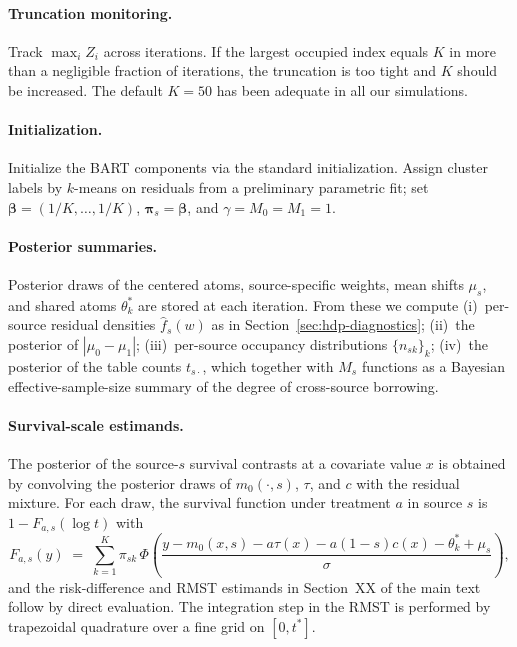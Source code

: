 \documentclass[11pt]{article}
\begin{document}
\paragraph{Truncation monitoring.} Track $\max_i Z_i$ across iterations. If the largest occupied index equals $K$ in more than a negligible fraction of iterations, the truncation is too tight and $K$ should be increased. The default $K = 50$ has been adequate in all our simulations.

\paragraph{Initialization.} Initialize the BART components via the standard \citet{chipman2010bart} initialization. Assign cluster labels by $k$-means on residuals from a preliminary parametric fit; set $\bm{\beta} = (1/K, \ldots, 1/K)$, $\bm{\pi}_s = \bm{\beta}$, and $\gamma = M_0 = M_1 = 1$.

\paragraph{Posterior summaries.} Posterior draws of the centered atoms, source-specific weights, mean shifts $\mu_s$, and shared atoms $\theta_k^*$ are stored at each iteration. From these we compute (i)~per-source residual densities $\hat f_s(w)$ as in Section~\ref{sec:hdp-diagnostics}; (ii)~the posterior of $|\mu_0 - \mu_1|$; (iii)~per-source occupancy distributions $\{n_{sk}\}_k$; (iv)~the posterior of the table counts $t_{s\cdot}$, which together with $M_s$ functions as a Bayesian effective-sample-size summary of the degree of cross-source borrowing.

\paragraph{Survival-scale estimands.} The posterior of the source-$s$ survival contrasts at a covariate value $x$ is obtained by convolving the posterior draws of $m_0(\cdot, s)$, $\tau$, and $c$ with the residual mixture. For each draw, the survival function under treatment $a$ in source $s$ is $1 - F_{a, s}(\log t)$ with
\begin{equation}
F_{a, s}(y) \;=\; \sum_{k=1}^K \pi_{sk}\, \Phi\!\left(\frac{y - m_0(x, s) - a \tau(x) - a(1 - s) c(x) - \theta_k^* + \mu_s}{\sigma}\right),
\end{equation}
and the risk-difference and RMST estimands in Section~XX of the main text follow by direct evaluation. The integration step in the RMST is performed by trapezoidal quadrature over a fine grid on $[0, t^*]$.
\end{document}
